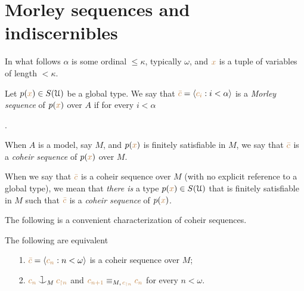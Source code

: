 \documentclass[creche.tex]{subfiles}
\begin{document}
\section{Morley sequences and indiscernibles}

In what follows $\alpha$ is some ordinal $\le\kappa$, typically $\omega$, and ${\color{brown} x}$ is a tuple of variables of length $<\kappa$.

Let \mbox{$p({\color{brown} x})\in S(\EuScript U)$} be a global type.
We say that ${\color{brown}\bar c}=\langle{\color{brown}c_i}:i<\alpha\rangle$ is a \emph{Morley sequence\/} of $p({\color{brown} x})$ over $A$ if for every $i<\alpha$

.

When $A$ is a model, say $M$, and $p({\color{brown} x})$ is finitely satisfiable in $M$, we say that ${\color{brown}\bar c}$ is a \emph{coheir sequence\/} of $p({\color{brown} x})$ over $M$. 

When we say that ${\color{brown}\bar c}$ is a coheir sequence over $M$ (with no explicit reference to a global type), we mean that \textit{there is\/} a type $p({\color{brown} x})\in S(\EuScript U)$ that is finitely satisfiable in $M$ such that ${\color{brown}\bar c}$ is a \emph{coheir sequence\/} of $p({\color{brown} x})$.

The following is a convenient characterization of coheir sequences.

\begin{lemma}\label{lem_coheir_property}
The following are equivalent
\begin{itemize}
\item[1.] ${\color{brown}\bar c}=\langle{\color{brown}c_n}:n<\omega\rangle$ is a coheir sequence over $M$;
\item[2.] ${\mr c_n}\cnonfork_M{\mr c_{\restriction n}}$ and ${\color{brown} c_{n+1}}\equiv_{M,\,{\color{brown} c_{\restriction n}}}{\color{brown} c_n}$ for every $n<\omega$.
\end{itemize}
\end{lemma}
\end{document}
